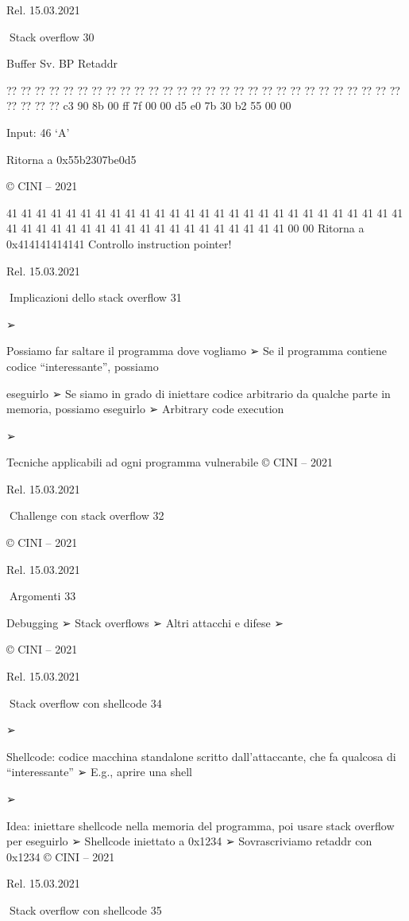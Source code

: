 \documentclass[11pt,a4paper]{article}
\begin{document}
Rel. 15.03.2021

Stack overflow 30

Buffer Sv. BP Retaddr

?? ?? ?? ?? ?? ?? ?? ?? ?? ?? ?? ?? ?? ?? ?? ?? ?? ?? ?? ?? ?? ?? ?? ??
?? ?? ?? ?? ?? ?? ?? ?? c3 90 8b 00 ff 7f 00 00 d5 e0 7b 30 b2 55 00 00

Input: 46 `A'

Ritorna a 0x55b2307be0d5

© CINI -- 2021

41 41 41 41 41 41 41 41 41 41 41 41 41 41 41 41 41 41 41 41 41 41 41 41
41 41 41 41 41 41 41 41 41 41 41 41 41 41 41 41 41 41 41 41 41 41 00 00
Ritorna a 0x414141414141 Controllo instruction pointer!

Rel. 15.03.2021

Implicazioni dello stack overflow 31

➢

Possiamo far saltare il programma dove vogliamo ➢ Se il programma
contiene codice ``interessante'', possiamo

eseguirlo ➢ Se siamo in grado di iniettare codice arbitrario da qualche
parte in memoria, possiamo eseguirlo ➢ Arbitrary code execution

➢

Tecniche applicabili ad ogni programma vulnerabile © CINI -- 2021

Rel. 15.03.2021

Challenge con stack overflow 32

© CINI -- 2021

Rel. 15.03.2021

Argomenti 33

Debugging ➢ Stack overflows ➢ Altri attacchi e difese ➢

© CINI -- 2021

Rel. 15.03.2021

Stack overflow con shellcode 34

➢

Shellcode: codice macchina standalone scritto dall'attaccante, che fa
qualcosa di ``interessante'' ➢ E.g., aprire una shell

➢

Idea: iniettare shellcode nella memoria del programma, poi usare stack
overflow per eseguirlo ➢ Shellcode iniettato a 0x1234 ➢ Sovrascriviamo
retaddr con 0x1234 © CINI -- 2021

Rel. 15.03.2021

Stack overflow con shellcode 35
\end{document}

